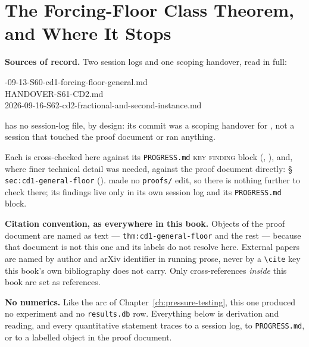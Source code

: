\chapter{The Forcing-Floor Class Theorem, and Where It Stops}
\label{ch:forcing-floor}

\begin{record}
\textbf{Sources of record.} Two session logs and one scoping handover, read in
full:

\smallskip
{\raggedright{}-09-13-S60-cd1-forcing-floor-general.md\\
HANDOVER-S61-CD2.md\\
2026-09-16-S62-cd2-fractional-and-second-instance.md\par}

\smallskip
{} has no session-log file, by design: its commit was a scoping handover
for , not a session that touched the proof document or ran anything.

\smallskip
Each is cross-checked here against its \texttt{PROGRESS.md} \textsc{key
finding} block (, ), and, where finer technical detail was
needed, against the proof document directly: \S\,\texttt{sec:cd1-general-floor}
().  made no \texttt{proofs/} edit, so there is nothing further
to check there; its findings live only in its own session log and its
\texttt{PROGRESS.md} block.

\smallskip
\textbf{Citation convention, as everywhere in this book.} Objects of the proof
document are named as text --- \texttt{thm:cd1-general-floor} and the rest ---
because that document is not this one and its labels do not resolve here.
External papers are named by author and arXiv identifier in running prose,
never by a \texttt{\textbackslash cite} key this book's own bibliography does
not carry. Only cross-references \emph{inside} this book are set as
references.

\smallskip
\textbf{No numerics.} Like the arc of Chapter~\ref{ch:pressure-testing}, this
one produced no experiment and no \texttt{results.db} row. Everything below is
derivation and reading, and every quantitative statement traces to a session
log, to \texttt{PROGRESS.md}, or to a labelled object in the proof document.
\end{record}

